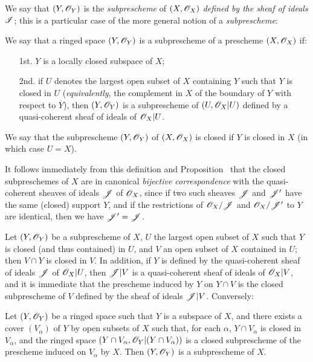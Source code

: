 We say that $(Y,\mathscr{O}_Y)$ is the \emph{subprescheme} of $(X,\mathscr{O}_X)$ \emph{defined by the sheaf of ideals $\mathscr{I}$};
this is a particular case of the more general notion of a \emph{subprescheme}:

\begin{definition}[4.1.3]
\label{I.4.1.3}
We say that a ringed space $(Y,\mathscr{O}_Y)$ is a subprescheme of a prescheme $(X,\mathscr{O}_X)$ if:
\begin{enumerate}
  \item[1st.] $Y$ is a locally closed subspace of $X$;
  \item[2nd.] if $U$ denotes the largest open subset of $X$ containing $Y$ such that $Y$ is closed in $U$ (\emph{equivalently}, the complement in $X$ of the boundary of $Y$ with respect to $\overline{Y}$), then $(Y,\mathscr{O}_Y)$ is a subprescheme of $(U,\mathscr{O}_X|U)$ defined by a quasi-coherent sheaf of ideals of $\mathscr{O}_X|U$.
\end{enumerate}
We say that the subprescheme $(Y,\mathscr{O}_Y)$ of $(X,\mathscr{O}_X)$ is closed if $Y$ is closed in $X$ (in which case $U=X$).
\end{definition}

It follows immediately from this definition and Proposition~ that the closed subpreschemes of $X$ are in canonical \emph{bijective correspondence} with the quasi-coherent sheaves of ideals $\mathscr{J}$ of $\mathscr{O}_X$, since if two such sheaves $\mathscr{J}$ and $\mathscr{J}'$ have the same (closed) support $Y$, and if the restrictions of $\mathscr{O}_X/\mathscr{J}$ and $\mathscr{O}_X/\mathscr{J}'$ to $Y$ are identical, then we have $\mathscr{J}'=\mathscr{J}$.

\begin{env}[4.1.4]
\label{I.4.1.4}
Let $(Y,\mathscr{O}_Y)$ be a subprescheme of $X$, $U$ the largest open subset of $X$ such that $Y$ is closed (and thus contained) in $U$, and $V$ an open subset of $X$ contained in $U$;
then $V\cap Y$ is closed in $V$.
In addition, if $Y$ is defined by the quasi-coherent sheaf of ideals $\mathscr{J}$ of $\mathscr{O}_X|U$, then $\mathscr{J}|V$ is a quasi-coherent sheaf of ideals of $\mathscr{O}_X|V$, and it is immediate that the prescheme induced by $Y$ on $Y\cap V$ is the closed subprescheme of $V$ defined by the sheaf of ideals $\mathscr{J}|V$.
Conversely:
\end{env}

\begin{proposition}[4.1.5]
\label{I.4.1.5}
Let $(Y,\mathscr{O}_Y)$ be a ringed space such that $Y$ is a subspace of $X$, and there exists a cover $(V_\alpha)$ of $Y$ by open subsets of $X$ such that, for each $\alpha$, $Y\cap V_\alpha$ is closed in $V_\alpha$, and the ringed space $(Y\cap V_\alpha,\mathscr{O}_Y|(Y\cap V_\alpha))$ is a closed subprescheme of the prescheme induced on $V_\alpha$ by $X$.
Then $(Y,\mathscr{O}_Y)$ is a subprescheme of $X$.
\end{proposition}

